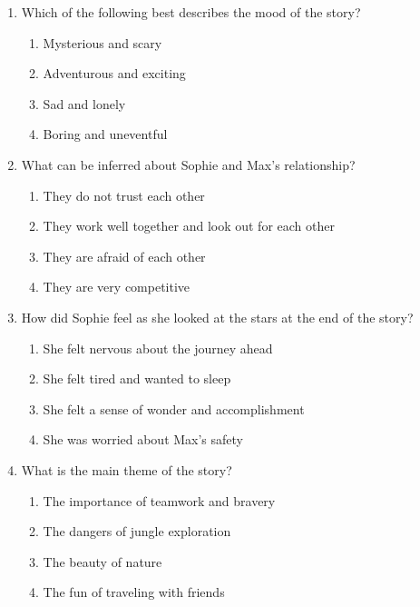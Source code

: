 \documentclass[12pt]{article}
\begin{document}
\begin{enumerate}
    \vspace{0.5cm}

    \item Which of the following best describes the mood of the story?

    \begin{enumerate}[label=\Alph*.]
        \item Mysterious and scary
        \item Adventurous and exciting
        \item Sad and lonely
        \item Boring and uneventful
    \end{enumerate}
    
    \vspace{0.5cm}

    \item What can be inferred about Sophie and Max’s relationship?

    \begin{enumerate}[label=\Alph*.]
        \item They do not trust each other
        \item They work well together and look out for each other
        \item They are afraid of each other
        \item They are very competitive
    \end{enumerate}
    
    \vspace{0.5cm}

    \item How did Sophie feel as she looked at the stars at the end of the story?

    \begin{enumerate}[label=\Alph*.]
        \item She felt nervous about the journey ahead
        \item She felt tired and wanted to sleep
        \item She felt a sense of wonder and accomplishment
        \item She was worried about Max’s safety
    \end{enumerate}
    
    \vspace{0.5cm}

    \item What is the main theme of the story?

    \begin{enumerate}[label=\Alph*.]
        \item The importance of teamwork and bravery
        \item The dangers of jungle exploration
        \item The beauty of nature
        \item The fun of traveling with friends
    \end{enumerate}

\end{enumerate}
\end{document}
